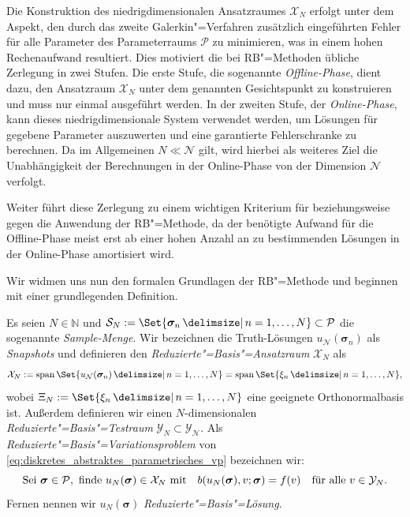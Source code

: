 \documentclass[../main.tex]{subfiles}
\begin{document}
Die Konstruktion des niedrigdimensionalen Ansatzraumes $\mathcal X_{N}$ erfolgt unter dem Aspekt, den durch das zweite Galerkin"=Verfahren zusätzlich eingeführten Fehler für alle Parameter des Parameterraums $\mathcal P$ zu minimieren, was in einem hohen Rechenaufwand resultiert.
Dies motiviert die bei RB"=Methoden übliche Zerlegung in zwei Stufen.
Die erste Stufe, die sogenannte \emph{Offline-Phase}, dient dazu, den Ansatzraum $\mathcal X_{N}$ unter dem genannten Gesichtspunkt zu konstruieren und muss nur einmal ausgeführt werden.
In der zweiten Stufe, der \emph{Online-Phase}, kann dieses niedrigdimensionale System verwendet werden, um Lösungen für gegebene Parameter auszuwerten und eine garantierte Fehlerschranke zu berechnen.
Da im Allgemeinen $N \ll \mathcal N$ gilt, wird hierbei als weiteres Ziel die Unabhängigkeit der Berechnungen in der Online-Phase von der Dimension $\mathcal N$ verfolgt.

Weiter führt diese Zerlegung zu einem wichtigen Kriterium für beziehungsweise gegen die Anwendung der RB"=Methode, da der benötigte Aufwand für die Offline-Phase meist erst ab einer hohen Anzahl an zu bestimmenden Lösungen in der Online-Phase amortisiert wird.

Wir widmen uns nun den formalen Grundlagen der RB"=Methode und beginnen mit einer grundlegenden Definition.

\begin{Definition}
\label{definition:rb_variationsproblem}
    Es seien $N \in \mathbb{N}$ und $\mathcal S_{N} := \Set{ \bm \sigma_{n} \given n = 1, \dots, N } \subset \mathcal P$ die sogenannte \emph{Sample-Menge}.
    Wir bezeichnen die Truth-Lösungen $u_{\mathcal N}(\bm \sigma_{n})$ als \emph{Snapshots} und definieren den \emph{Reduzierte"=Basis"=Ansatzraum} $\mathcal X_{N}$ als
    \begin{equation}\label{eq:def_rb_ansatzraum}
        \mathcal X_{N} := \spn \Set{ u_{\mathcal N}(\bm \sigma_{n}) \given n = 1, \dots, N} = \spn \Set{ \xi_{n} \given n = 1, \dots, N},
    \end{equation}
    wobei $\Xi_{N} := \Set{ \xi_{n} \given n = 1, \dots, N}$ eine geeignete Orthonormalbasis ist.
    Außerdem definieren wir einen $N$-dimensionalen \emph{Reduzierte"=Basis"=Testraum} $\mathcal Y_{N} \subset \mathcal Y_{\mathcal N}$.
    Als \emph{Reduzierte"=Basis"=Variationsproblem} von \cref{eq:diskretes_abstraktes_parametrisches_vp} bezeichnen wir:
    \begin{equation}
    \label{eq:rb_abstraktes_parametriches_vp}
        \text{Sei } \bm \sigma \in \mathcal P, \text{ finde } u_{N}(\bm \sigma) \in \mathcal X_{N} \text{ mit} \quad b(u_{N}(\bm \sigma), v; \bm \sigma) = f(v) \quad \fa v \in \mathcal Y_{N}.
    \end{equation}
    Fernen nennen wir $u_{N}(\bm \sigma)$ \emph{Reduzierte"=Basis"=Lösung}.
\end{Definition}
\end{document}

